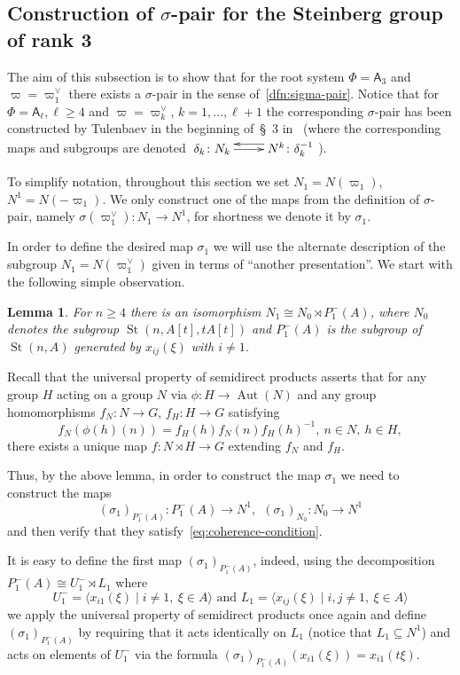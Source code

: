 \documentclass[oneside, 10pt]{amsart}
\DeclareMathOperator{\St}{St}
\DeclareMathOperator{\Aut}{Aut}
\newcommand{\rA}{\mathsf{A}}
\numberwithin{equation}{section}
\newtheorem{lemma}{Lemma}
\numberwithin{lemma}{section}
\theoremstyle{definition}
\theoremstyle{remark}
\begin{document}
\subsection{Construction of \texorpdfstring{$\sigma$}{sigma}-pair for the Steinberg group of rank 3}
The aim of this subsection is to show that for the root system $\Phi=\rA_3$ and $\varpi = \varpi_1^\vee$
 there exists a $\sigma$-pair in the sense of~\cref{dfn:sigma-pair}.
Notice that for $\Phi = \rA_\ell, \ell \geq 4$ and $\varpi=\varpi_k^\vee$, $k=1,\ldots,\ell+1$ 
the corresponding $\sigma$-pair has been constructed by Tulenbaev in the beginning of~\S~3 in~\cite{Tu83} 
 (where the corresponding maps and subgroups are denoted $\xymatrix{\delta_k \ar[r] \colon N_k & \ar@<-1.0ex>[l] N^k \colon \delta_k^{-1}}$).

To simplify notation, throughout this section we set $N_1 = N(\varpi_1)$, $N^1 = N(-\varpi_1)$.
We only construct one of the maps from the definition of $\sigma$-pair, namely $\sigma(\varpi_1^\vee) \colon N_1 \to N^1$,
 for shortness we denote it by $\sigma_1$.
 
In order to define the desired map $\sigma_1$ we will use the alternate description of the subgroup $N_1 = N(\varpi_1^\vee)$
given in terms of ``another presentation''. We start with the following simple observation.
\begin{lemma} \label{lem:n1-decomp} For $n\geq 4$ there is an isomorphism $N_1 \cong N_{0} \rtimes P_1^-(A)$, 
 where $N_{0}$ denotes the subgroup $\St(n, A[t], tA[t])$ and $P_1^-(A)$ is the subgroup of $\St(n, A)$ generated by $x_{ij}(\xi)$ with $i\neq 1$.
\end{lemma}

Recall that the universal property of semidirect products asserts that for any group $H$ acting on a group $N$ via $\phi \colon H \to \Aut(N)$ 
and any group homomorphisms $f_N\colon N \to G$, $f_H\colon H \to G$ satisfying 
\begin{equation} \label{eq:coherence-condition} f_N(\phi(h)(n)) = f_H(h) f_N(n) f_H(h)^{-1},\ n\in N,\ h\in H,\end{equation} 
there exists a unique map $f\colon N \rtimes H \to G$ extending $f_N$ and $f_H$.

Thus, by the above lemma, in order to construct the map $\sigma_1$ we need to construct the maps 
\[ (\sigma_1)_{P_1^-(A)} \colon P_1^-(A) \to N^1, \ \ (\sigma_1)_{N_{0}} \colon N_{0} \to N^1\]
and then verify that they satisfy~\eqref{eq:coherence-condition}.

It is easy to define the first map $(\sigma_1)_{P_1^-(A)}$, indeed, using the decomposition $P_1^-(A) \cong U^-_1 \rtimes L_1$ where 
\[U^-_1 = \langle x_{i1}(\xi) \mid i\neq 1,\ \xi\in A \rangle \text{ and } L_1 = \langle x_{ij}(\xi) \mid i,  j \neq 1,\ \xi\in A\rangle \]
we apply the universal property of semidirect products once again 
and define $(\sigma_1)_{P_1^-(A)}$ by requiring that it acts identically on $L_1$ (notice that $L_1 \subseteq N^1$)
and acts on elements of $U^-_1$ via the formula $(\sigma_1)_{P_1^-(A)}(x_{i1}(\xi))= x_{i1}(t\xi)$.
\end{document}
